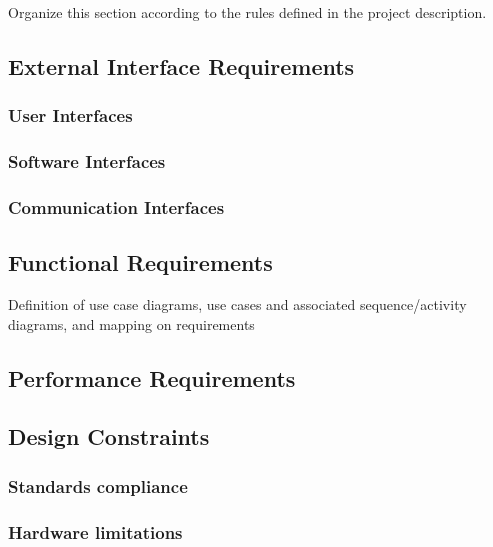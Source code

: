 Organize this section according to the rules defined in the project description. 
\subsection{External Interface Requirements}
\subsubsection{User Interfaces}
\subsubsection{Software Interfaces}
\subsubsection{Communication Interfaces}
\subsection{Functional Requirements}
Definition of use case diagrams, use cases and associated sequence/activity diagrams, and mapping on requirements

\setcounter{usecase_counter}{1}



%

 
%
% 
% 
% 


\subsection{Performance Requirements}
\subsection{Design Constraints}
\subsubsection{Standards compliance}
\subsubsection{Hardware limitations}
